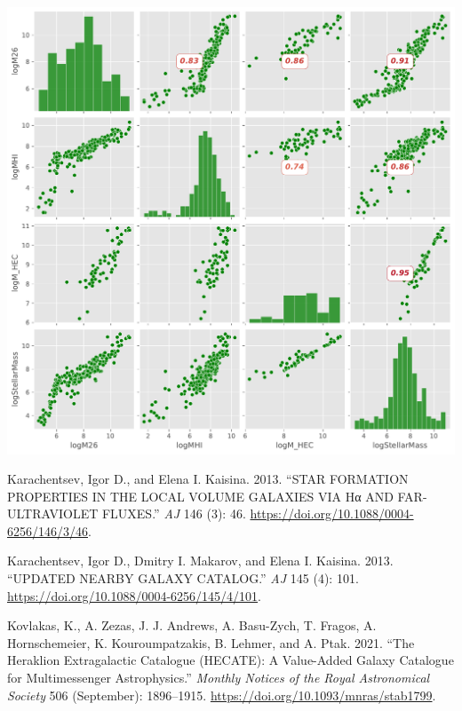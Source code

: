 \documentclass[
]{article}
\newlength{\cslhangindent}
\newenvironment{CSLReferences}[2] %
 {\begin{list}{}{%
  \setlength{\itemindent}{0pt}
  \setlength{\leftmargin}{0pt}
  \setlength{\parsep}{0pt}
  \ifodd #1
   \setlength{\leftmargin}{\cslhangindent}
   \setlength{\itemindent}{-1\cslhangindent}
  \fi
  \setlength{\itemsep}{#2\baselineskip}}}
 {\end{list}}
\begin{document}
\includegraphics{compare_files/figure-pdf/cell-49-output-1.pdf}

\label{refs}
\begin{CSLReferences}{1}{0}
Karachentsev, Igor D., and Elena I. Kaisina. 2013. {``{STAR FORMATION
PROPERTIES IN THE LOCAL VOLUME GALAXIES VIA Hα AND FAR-ULTRAVIOLET
FLUXES}.''} \emph{AJ} 146 (3): 46.
\url{https://doi.org/10.1088/0004-6256/146/3/46}.

Karachentsev, Igor D., Dmitry I. Makarov, and Elena I. Kaisina. 2013.
{``{UPDATED NEARBY GALAXY CATALOG}.''} \emph{AJ} 145 (4): 101.
\url{https://doi.org/10.1088/0004-6256/145/4/101}.

Kovlakas, K., A. Zezas, J. J. Andrews, A. Basu-Zych, T. Fragos, A.
Hornschemeier, K. Kouroumpatzakis, B. Lehmer, and A. Ptak. 2021. {``The
{Heraklion Extragalactic Catalogue} ({HECATE}): A Value-Added Galaxy
Catalogue for Multimessenger Astrophysics.''} \emph{Monthly Notices of
the Royal Astronomical Society} 506 (September): 1896--1915.
\url{https://doi.org/10.1093/mnras/stab1799}.

\end{CSLReferences}
\end{document}
